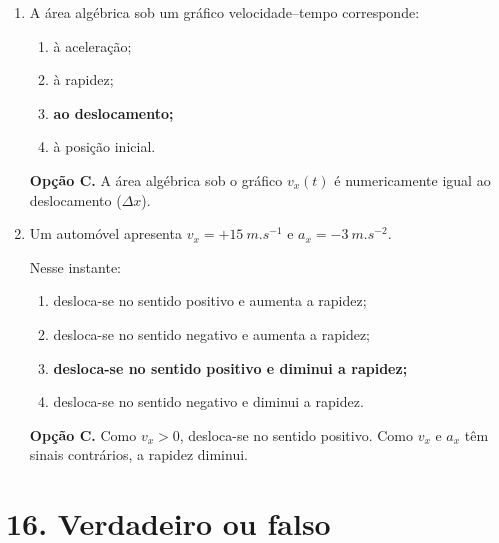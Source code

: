 \documentclass[11pt,a4paper]{article}
\begin{document}
\begin{enumerate}[label=\textbf{\arabic*.},resume]
		\begin{solucao}
			\textbf{Opção B.} Sinais opostos em $v_x$ e $a_x$ significam que $\vec{v}$ e $\vec{a}$ têm sentidos contrários, reduzindo a rapidez.
		\end{solucao}
		
		\item A área algébrica sob um gráfico velocidade--tempo corresponde:
		
		\begin{enumerate}[label=\Alph*.]
			\item à aceleração;
			\item à rapidez;
			\item \textbf{ao deslocamento;}
			\item à posição inicial.
		\end{enumerate}
		
		\begin{solucao}
			\textbf{Opção C.} A área algébrica sob o gráfico $v_x(t)$ é numericamente igual ao deslocamento ($\Delta x$).
		\end{solucao}
		
		\item Um automóvel apresenta $v_x=+\SI{15}{m.s^{-1}}$ e
		$a_x=-\SI{3}{m.s^{-2}}$.
		
		Nesse instante:
		
		\begin{enumerate}[label=\Alph*.]
			\item desloca-se no sentido positivo e aumenta a rapidez;
			\item desloca-se no sentido negativo e aumenta a rapidez;
			\item \textbf{desloca-se no sentido positivo e diminui a rapidez;}
			\item desloca-se no sentido negativo e diminui a rapidez.
		\end{enumerate}
		
		\begin{solucao}
			\textbf{Opção C.} Como $v_x > 0$, desloca-se no sentido positivo. Como $v_x$ e $a_x$ têm sinais contrários, a rapidez diminui.
		\end{solucao}
		
	\end{enumerate}
	
	\section*{16. Verdadeiro ou falso}
	
\end{document}
